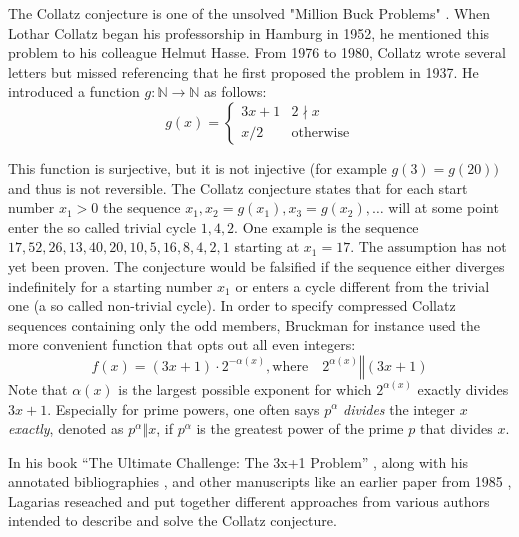 The Collatz conjecture is one of the unsolved "Million Buck Problems" \cite{Ref_Williams_2000}. When Lothar Collatz began his professorship in Hamburg in 1952, he mentioned this problem to his colleague Helmut Hasse. From 1976 to 1980, Collatz wrote several letters but missed referencing that he first proposed the problem in 1937. He introduced a function $g:\mathbb{N}\rightarrow\mathbb{N}$ as follows:
\begin{equation}
\label{eq:func_collatz}
g(x)=
\begin{cases}
3x+1	&	2\nmid x\\
x/2		&	\text{otherwise}
\end{cases}
\end{equation}

This function is surjective, but it is not injective (for example $g(3)=g(20))$ and thus is not reversible. The Collatz conjecture states that for each start number $x_1>0$ the sequence $x_1,x_2=g(x_1),x_3=g(x_2),\ldots$ will at some point enter the so called trivial cycle $1,4,2$. One example is the sequence $17,52,26,13,40,20,10,5,16,8,4,2,1$ starting at $x_1=17$. The assumption has not yet been proven. The conjecture would be falsified if the sequence either diverges indefinitely for a starting number $x_1$ or enters a cycle different from the trivial one (a so called non-trivial cycle). In order to specify compressed Collatz sequences containing only the odd members, Bruckman \cite{Ref_Bruckman_2008} for instance used the more convenient function that opts out all even integers:
\begin{equation}
\label{eq:func_collatz_odd}
f(x)=(3x+1)\cdot2^{-\alpha(x)},\text{where}\hspace{1em}2^{\alpha(x)}\mathrel\Vert(3x+1)
\end{equation}
Note that $\alpha(x)$ is the largest possible exponent for which $2^{\alpha(x)}$ exactly divides $3x+1$. Especially for prime powers, one often says $p^\alpha$ \textit{divides} the integer $x$ \textit{exactly}, denoted as $p^\alpha\mathrel\Vert x$, if $p^\alpha$ is the greatest power of the prime $p$ that divides $x$.

In his book “The Ultimate Challenge: The 3x+1 Problem” \cite{Ref_Lagarias_2010}, along with his annotated bibliographies \cite{Ref_Lagarias_2011}, \cite{Ref_Lagarias_2012} and other manuscripts like an earlier paper from 1985 \cite{Ref_Lagarias_1985}, Lagarias reseached and put together different approaches from various authors intended to describe and solve the Collatz conjecture.

